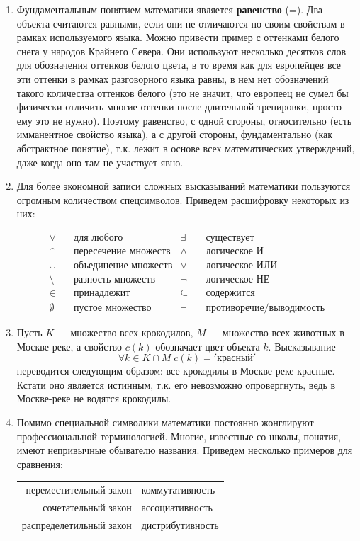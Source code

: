 \begin{enumerate}
\item Фундаментальным понятием математики является \textbf{равенство} (=). Два объекта считаются равными, если они не отличаются по своим свойствам в рамках используемого языка. Можно привести пример с оттенками белого снега у народов Крайнего Севера. Они используют несколько десятков слов для обозначения оттенков белого цвета, в то время как для европейцев все эти оттенки в рамках разговорного языка равны, в нем нет обозначений такого количества оттенков белого (это не значит, что европеец не сумел бы физически отличить многие оттенки после длительной тренировки, просто ему это не нужно). Поэтому равенство, с одной стороны, относительно (есть имманентное свойство языка), а с другой стороны, фундаментально (как абстрактное понятие), т.к. лежит в основе всех математических утверждений, даже когда оно там не участвует явно.
\item Для более экономной записи сложных высказываний математики пользуются огромным количеством спецсимволов. Приведем расшифровку некоторых из них:

\begin{align*}
\forall & \quad\mbox{для любого} & \exists & \quad\mbox{существует}  \\
\cap & \quad\mbox{пересечение множеств} & \land & \quad\mbox{логическое И}  \\
\cup & \quad\mbox{объединение множеств} & \lor & \quad\mbox{логическое ИЛИ}  \\
\setminus & \quad\mbox{разность множеств} & \neg & \quad\mbox{логическое НЕ}  \\
\in & \quad\mbox{принадлежит} & \subseteq & \quad\mbox{содержится}  \\
\emptyset & \quad\mbox{пустое множество} & \vdash & \quad\mbox{противоречие/выводимость}
\end{align*}

\item Пусть $K$ --- множество всех крокодилов, $M$ --- множество всех животных в Москве-реке, а свойство $c(k)$ обозначает цвет объекта $k$. Высказывание
$$
\forall k\in K\cap M\;c(k)= {}'\mbox{красный}'
$$
переводится следующим образом: все крокодилы в Москве-реке красные. Кстати оно является истинным, т.к. его невозможно опровергнуть, ведь в Москве-реке не водятся крокодилы.

\item Помимо специальной символики математики постоянно жонглируют профессиональной терминологией. Многие, известные со школы, понятия, имеют непривычные обывателю названия. Приведем несколько примеров для сравнения:
\begin{center}
\begin{tabular}{r|l}
переместительный закон & коммутативность \\
сочетательный закон & ассоциативность \\
распределетильный закон & дистрибутивность
\end{tabular}
\end{center}


\end{enumerate}

